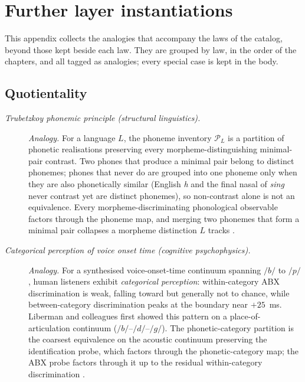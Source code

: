 \section{Further layer instantiations}\label{app:further-instantiations}

This appendix collects the analogies that accompany the laws of the catalog, beyond those kept beside each law. They are grouped by law, in the order of the chapters, and all tagged as analogies; every special case is kept in the body.

\subsection*{ Quotientality}
\begingroup\small
\begin{description}
\item[\emph{Trubetzkoy phonemic principle (structural linguistics).}] \textit{Analogy.}
For a language \(L\), the phoneme inventory \(\mathcal P_L\) is a
partition of phonetic realisations preserving every
morpheme-distinguishing minimal-pair contrast.  Two phones that
produce a minimal pair belong to distinct phonemes; phones that never
do are grouped into one phoneme only when they are also phonetically
similar (English \emph{h} and the final nasal of \emph{sing} never
contrast yet are distinct phonemes), so non-contrast alone is not an
equivalence.  Every morpheme-discriminating phonological observable
factors through the phoneme map, and merging two phonemes that form
a minimal pair collapses a morpheme distinction \(L\) tracks
\citep{Trubetzkoy1939GrundzugePhonologie}.

\item[\emph{Categorical perception of voice onset time (cognitive
psychophysics).}] \textit{Analogy.}
For a synthesised voice-onset-time continuum spanning \(/{\!b}/\) to
\(/{\!p}/\), human listeners exhibit \emph{categorical perception}:
within-category {ABX} discrimination is weak, falling toward but
generally not to chance, while between-category discrimination peaks
at the boundary near \(+25\)~ms.  Liberman and colleagues first
showed this pattern on a place-of-articulation continuum
(\(/{\!b}/\)--\(/{\!d}/\)--\(/{\!g}/\)).  The phonetic-category
partition is the coarsest equivalence on the acoustic continuum
preserving the identification probe, which factors through the
phonetic-category map; the ABX probe factors through it up to the
residual within-category discrimination
\citep{LibermanHarrisHoffmanGriffith1957Discrimination}.
\end{description}
\endgroup

